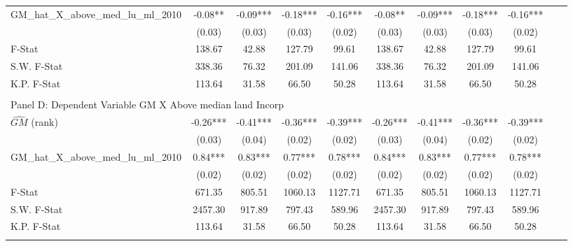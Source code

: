 \begin{table}[htbp]
\begin{threeparttable}
\begin{tabular}{l*{10}{c}}
\addlinespace
GM\_hat\_X\_above\_med\_lu\_ml\_2010&      -0.08** &      -0.09***&      -0.18***&      -0.16***&      -0.08** &      -0.09***&      -0.18***&      -0.16***\\
                &     (0.03)   &     (0.03)   &     (0.03)   &     (0.02)   &     (0.03)   &     (0.03)   &     (0.03)   &     (0.02)   \\
\midrule
F-Stat          &     138.67   &      42.88   &     127.79   &      99.61   &     138.67   &      42.88   &     127.79   &      99.61   \\
S.W. F-Stat     &     338.36   &      76.32   &     201.09   &     141.06   &     338.36   &      76.32   &     201.09   &     141.06   \\
K.P. F-Stat     &     113.64   &      31.58   &      66.50   &      50.28   &     113.64   &      31.58   &      66.50   &      50.28   \\
\cmidrule[\heavyrulewidth](lr){1-9} \\ \cmidrule[\heavyrulewidth](lr){1-9}
\multicolumn{8}{l}{Panel D: Dependent Variable GM X Above median land Incorp}\\
\cmidrule(lr){1-9}
$\hat{GM}$ (rank)&      -0.26***&      -0.41***&      -0.36***&      -0.39***&      -0.26***&      -0.41***&      -0.36***&      -0.39***\\
                &     (0.03)   &     (0.04)   &     (0.02)   &     (0.02)   &     (0.03)   &     (0.04)   &     (0.02)   &     (0.02)   \\
\addlinespace
GM\_hat\_X\_above\_med\_lu\_ml\_2010&       0.84***&       0.83***&       0.77***&       0.78***&       0.84***&       0.83***&       0.77***&       0.78***\\
                &     (0.02)   &     (0.02)   &     (0.02)   &     (0.02)   &     (0.02)   &     (0.02)   &     (0.02)   &     (0.02)   \\
\midrule
F-Stat          &     671.35   &     805.51   &    1060.13   &    1127.71   &     671.35   &     805.51   &    1060.13   &    1127.71   \\
S.W. F-Stat     &    2457.30   &     917.89   &     797.43   &     589.96   &    2457.30   &     917.89   &     797.43   &     589.96   \\
K.P. F-Stat     &     113.64   &      31.58   &      66.50   &      50.28   &     113.64   &      31.58   &      66.50   &      50.28   \\
\cmidrule[\heavyrulewidth](lr){1-9} \\ \cmidrule[\heavyrulewidth](lr){1-9}

\end{tabular}
\end{threeparttable}
\end{table}
